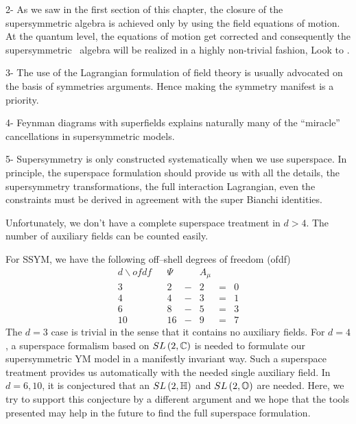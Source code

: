 \documentclass[a4paper,12pt]{book}
\begin{document}
2- As we saw in the first section of this chapter, the closure of the
supersymmetric algebra is achieved only by using the field equations of
motion. At the quantum level, the equations of motion get corrected and
consequently the supersymmetric \ algebra will be realized in a highly
non-trivial fashion, Look to \cite{superspace}.

3- The use of the Lagrangian formulation of field theory is usually
advocated on the basis of symmetries arguments. Hence making the symmetry
manifest is a priority.

4- Feynman diagrams with superfields explains naturally many of the
``miracle'' cancellations in supersymmetric models.

5- Supersymmetry is only constructed systematically when we use superspace.
In principle, the superspace formulation should provide us with all the
details, the supersymmetry transformations, the full interaction Lagrangian,
even the constraints must be derived in agreement with the super Bianchi
identities.

Unfortunately, we don't have a complete superspace treatment in $d>4$. The
number of auxiliary fields can be counted easily.

For SSYM, we have the following off--shell degrees of freedom (ofdf) 
\begin{equation}
\begin{array}{lllllll}
d\backslash ofdf &  & \Psi &  & A_{\mu } &  &  \\ 
3 &  & 2 & - & 2 & = & 0 \\ 
4 &  & 4 & - & 3 & = & 1 \\ 
6 &  & 8 & - & 5 & = & 3 \\ 
10 &  & 16 & - & 9 & = & 7
\end{array}
\end{equation}
The $d=3$ case is trivial in the sense that it contains no auxiliary fields.
For $d=4$, a superspace formalism based on $SL\left( 2,\Bbb{C}\right) $ is
needed to formulate our supersymmetric YM model in a manifestly invariant
way. Such a superspace treatment provides us automatically with the needed
single auxiliary field. In $d=6,10$, it is conjectured that an $SL\left( 2,%
\Bbb{H}\right) $ and $SL\left( 2,\Bbb{O}\right) $ are needed. Here, we try
to support this conjecture by a different argument and we hope that the
tools presented may help in the future to find the full superspace
formulation.
\end{document}
